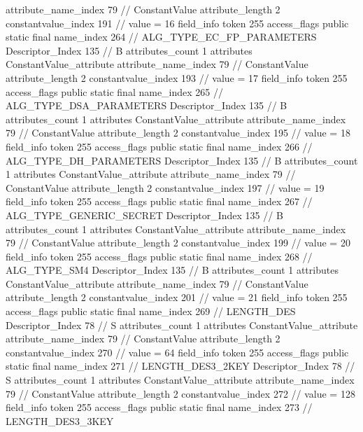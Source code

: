 {{{{{{{					attribute_name_index	79		// ConstantValue
					attribute_length	2
					constantvalue_index	191		// value = 16
				}
				}
			}
			field_info {
				token	255
				access_flags	public static final
				name_index	264		// ALG_TYPE_EC_FP_PARAMETERS
				Descriptor_Index	135		// B
				attributes_count	1
				attributes {
				ConstantValue_attribute {
					attribute_name_index	79		// ConstantValue
					attribute_length	2
					constantvalue_index	193		// value = 17
				}
				}
			}
			field_info {
				token	255
				access_flags	public static final
				name_index	265		// ALG_TYPE_DSA_PARAMETERS
				Descriptor_Index	135		// B
				attributes_count	1
				attributes {
				ConstantValue_attribute {
					attribute_name_index	79		// ConstantValue
					attribute_length	2
					constantvalue_index	195		// value = 18
				}
				}
			}
			field_info {
				token	255
				access_flags	public static final
				name_index	266		// ALG_TYPE_DH_PARAMETERS
				Descriptor_Index	135		// B
				attributes_count	1
				attributes {
				ConstantValue_attribute {
					attribute_name_index	79		// ConstantValue
					attribute_length	2
					constantvalue_index	197		// value = 19
				}
				}
			}
			field_info {
				token	255
				access_flags	public static final
				name_index	267		// ALG_TYPE_GENERIC_SECRET
				Descriptor_Index	135		// B
				attributes_count	1
				attributes {
				ConstantValue_attribute {
					attribute_name_index	79		// ConstantValue
					attribute_length	2
					constantvalue_index	199		// value = 20
				}
				}
			}
			field_info {
				token	255
				access_flags	public static final
				name_index	268		// ALG_TYPE_SM4
				Descriptor_Index	135		// B
				attributes_count	1
				attributes {
				ConstantValue_attribute {
					attribute_name_index	79		// ConstantValue
					attribute_length	2
					constantvalue_index	201		// value = 21
				}
				}
			}
			field_info {
				token	255
				access_flags	public static final
				name_index	269		// LENGTH_DES
				Descriptor_Index	78		// S
				attributes_count	1
				attributes {
				ConstantValue_attribute {
					attribute_name_index	79		// ConstantValue
					attribute_length	2
					constantvalue_index	270		// value = 64
				}
				}
			}
			field_info {
				token	255
				access_flags	public static final
				name_index	271		// LENGTH_DES3_2KEY
				Descriptor_Index	78		// S
				attributes_count	1
				attributes {
				ConstantValue_attribute {
					attribute_name_index	79		// ConstantValue
					attribute_length	2
					constantvalue_index	272		// value = 128
				}
				}
			}
			field_info {
				token	255
				access_flags	public static final
				name_index	273		// LENGTH_DES3_3KEY
}}}}}
